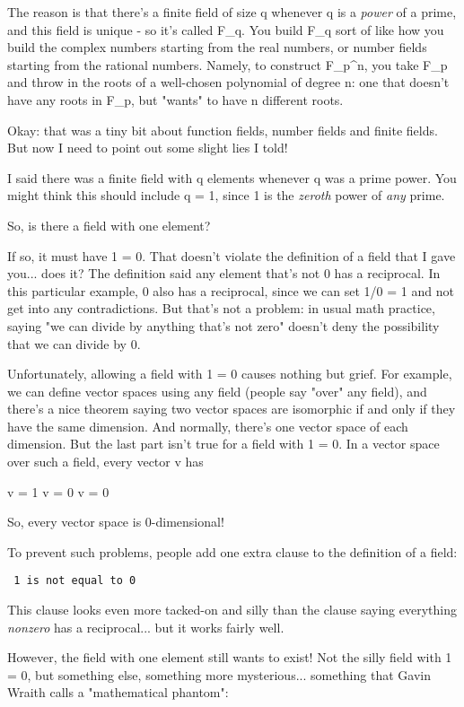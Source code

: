 The reason is that there's a finite field of size q whenever q is a
\emph{power} of a prime, and this field is unique - so it's called
F_{q}.  You build F_{q} sort of like how you build the
complex numbers starting from the real numbers, or number fields
starting from the rational numbers.  Namely, to construct
F_{p^{n}}, you take F_{p} and throw in the
roots of a well-chosen polynomial of degree n: one that doesn't have
any roots in F_{p}, but "wants" to have n different
roots.

Okay: that was a tiny bit about function fields, number fields and finite
fields.  But now I need to point out some slight lies I told!  

I said there was a finite field with q elements whenever q was a prime
power.  You might think this should include q = 1, since 1 is the
\emph{zeroth} power of \emph{any} prime.  

So, is there a field with one element?  

If so, it must have 1 = 0.  That doesn't violate the definition of
a field that I gave you... does it?  The definition said any element 
that's not 0 has a reciprocal.  In this particular example, 0 also has
a reciprocal, since we can set 1/0 = 1 and not get into any contradictions.  
But that's not a problem: in usual math practice, saying "we can divide 
by anything that's not zero" doesn't deny the possibility that we can
divide by 0.

Unfortunately, allowing a field with 1 = 0 causes nothing but grief.
For example, we can define vector spaces using any field (people say
"over" any field), and there's a nice theorem saying two
vector spaces are isomorphic if and only if they have the same
dimension.  And normally, there's one vector space of each dimension.
But the last part isn't true for a field with 1 = 0.  In a vector
space over such a field, every vector v has

v = 1 v = 0 v = 0

So, every vector space is 0-dimensional!  

To prevent such problems, people add one extra clause to the definition
of a field:

\begin{verbatim}
 1 is not equal to 0
\end{verbatim}
    
This clause looks even more tacked-on and silly than the clause
saying everything \emph{nonzero} has a reciprocal... but it works fairly
well.

However, the field with one element still wants to exist!  Not the
silly field with 1 = 0, but something else, something more mysterious...
something that Gavin Wraith calls a "mathematical phantom":
 
